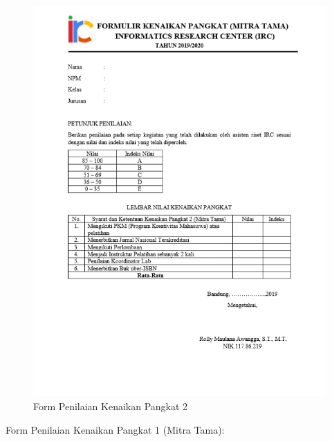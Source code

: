 \begin{figure}[H]
        \centerline{\includegraphics[scale=0.8]{figures/pangkat2}}
        \caption{Form Penilaian Kenaikan Pangkat 2}
		\label{pangkat2}
\end{figure}
Form Penilaian Kenaikan Pangkat 1 (Mitra Tama):
